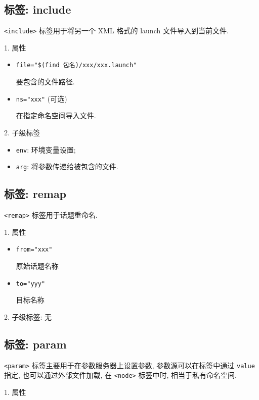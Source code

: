 \documentclass[openany, fontset=windowsold]{ctexbook}
\theoremstyle{kaiti}
\theoremstyle{normal}
\begin{document}
\subsection{标签: include}

\verb|<include>| 标签用于将另一个 XML 格式的 launch 文件导入到当前文件.

1. 属性

\begin{itemize}
  \item \verb|file="$(find 包名)/xxx/xxx.launch"|

  要包含的文件路径.

  \item \verb|ns="xxx"| (可选)

  在指定命名空间导入文件.
\end{itemize}

2. 子级标签

\begin{itemize}
  \item \verb|env|: 环境变量设置;
  \item \verb|arg|: 将参数传递给被包含的文件.
\end{itemize}

\subsection{标签: remap}

\verb|<remap>| 标签用于话题重命名.

1. 属性

\begin{itemize}
  \item \verb|from="xxx"|

  原始话题名称

  \item \verb|to="yyy"|

  目标名称
\end{itemize}

2. 子级标签: 无

\subsection{标签: param}

\verb|<param>| 标签主要用于在参数服务器上设置参数, 参数源可以在标签中通过 \verb|value| 指定, 也可以通过外部文件加载, 在 \verb|<node>| 标签中时, 相当于私有命名空间.

1. 属性
\end{document}
